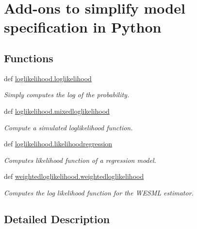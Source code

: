 \hypertarget{group__biogeme}{\section{Add-\/ons to simplify model specification in Python}
\label{group__biogeme}
}
\subsection*{Functions}
\begin{DoxyCompactItemize}
\item 
def \hyperlink{group__biogeme_ga5b2503cb3556094aaf0ef67176297496}{loglikelihood.\+loglikelihood}
\begin{DoxyCompactList}\small\item\em Simply computes the log of the probability. \end{DoxyCompactList}\item 
def \hyperlink{group__biogeme_gad38ed3ddf12bbc51eb728fb56a0bc8de}{loglikelihood.\+mixedloglikelihood}
\begin{DoxyCompactList}\small\item\em Compute a simulated loglikelihood function. \end{DoxyCompactList}\item 
def \hyperlink{group__biogeme_ga88aabd751d1bfaad0a74cf8513efefc1}{loglikelihood.\+likelihoodregression}
\begin{DoxyCompactList}\small\item\em Computes likelihood function of a regression model. \end{DoxyCompactList}\item 
def \hyperlink{group__biogeme_ga699531bc64b4cecc340c6f4546da92bc}{weightedloglikelihood.\+weightedloglikelihood}
\begin{DoxyCompactList}\small\item\em Computes the log likelihood function for the W\+E\+S\+M\+L estimator. \end{DoxyCompactList}\end{DoxyCompactItemize}


\subsection{Detailed Description}


